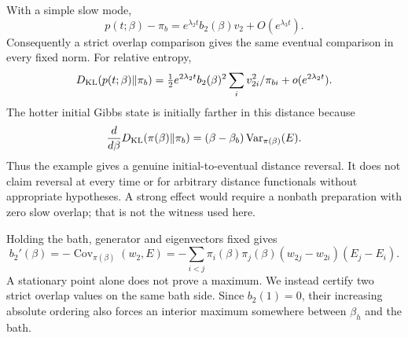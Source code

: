\documentclass[11pt]{article}
\newcommand{\Cov}{\operatorname{Cov}}
\newcommand{\Var}{\operatorname{Var}}
\begin{document}
With a simple slow mode,
\[
p(t;\beta)-\pi_b=e^{\lambda_2t}b_2(\beta)v_2+O(e^{\lambda_3t}).
\]
Consequently a strict overlap comparison gives the same eventual comparison in every fixed norm. For relative entropy,
\[
D_{\rm KL}(p(t;\beta)\Vert\pi_b)=\tfrac12e^{2\lambda_2t}b_2(\beta)^2
\sum_i v_{2i}^2/\pi_{bi}+o(e^{2\lambda_2t}).
\]
The hotter initial Gibbs state is initially farther in this distance because
\[
\frac{d}{d\beta}D_{\rm KL}(\pi(\beta)\Vert\pi_b)
=(\beta-\beta_b)\Var_{\pi(\beta)}(E).
\]
Thus the example gives a genuine initial-to-eventual distance reversal. It does not claim reversal at every time or for arbitrary distance functionals without appropriate hypotheses. A strong effect would require a nonbath preparation with zero slow overlap; that is not the witness used here.

Holding the bath, generator and eigenvectors fixed gives
\[
b_2'(\beta)=-\Cov_{\pi(\beta)}(w_2,E)
=-\sum_{i<j}\pi_i(\beta)\pi_j(\beta)(w_{2j}-w_{2i})(E_j-E_i).
\]
A stationary point alone does not prove a maximum. We instead certify two strict overlap values on the same bath side. Since $b_2(1)=0$, their increasing absolute ordering also forces an interior maximum somewhere between $\beta_h$ and the bath.
\end{document}
